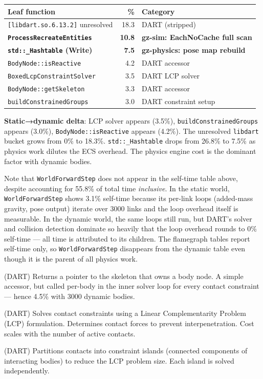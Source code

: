 \documentclass[11pt, a4paper]{article}
\begin{document}
\begin{longtable}[]{@{}lrl@{}}
\toprule\noalign{}
Leaf function & \% & Category \\
\midrule\noalign{}
\endhead
\bottomrule\noalign{}
\endlastfoot
\texttt{{[}libdart.so.6.13.2{]}} unresolved & 18.3 & DART (stripped) \\
\textbf{\texttt{ProcessRecreateEntities}} & \textbf{10.8} & \textbf{gz-sim: EachNoCache full scan} \\
\textbf{\texttt{std::\_Hashtable} (Write)} & \textbf{7.5} & \textbf{gz-physics: pose map rebuild} \\
\texttt{BodyNode::isReactive} & 4.2 & DART accessor \\
\texttt{BoxedLcpConstraintSolver} & 3.5 & DART LCP solver \\
\texttt{BodyNode::getSkeleton} & 3.3 & DART accessor \\
\texttt{buildConstrainedGroups} & 3.0 & DART constraint setup \\
\end{longtable}

\textbf{Static→dynamic delta}: LCP solver appears (3.5\%),
\texttt{buildConstrainedGroups} appears (3.0\%),
\texttt{BodyNode::isReactive} appears (4.2\%). The unresolved
\texttt{libdart} bucket grows from 0\% to 18.3\%. \texttt{std::\_Hashtable} drops from 26.8\% to 7.5\% as physics work dilutes the ECS overhead. The physics engine cost is the dominant factor with dynamic bodies.

Note that \texttt{WorldForwardStep} does not appear in the self-time table above, despite accounting for 55.8\% of total time \emph{inclusive}. In the static world, \texttt{WorldForwardStep} shows 3.1\% self-time because its per-link loops (added-mass gravity, pose output) iterate over 3000 links and the loop overhead itself is measurable. In the dynamic world, the same loops still run, but DART's solver and collision detection dominate so heavily that the loop overhead rounds to 0\% self-time --- all time is attributed to its children. The flamegraph tables report self-time only, so \texttt{WorldForwardStep} disappears from the dynamic table even though it is the parent of all physics work.

\begin{description}[style=nextline, leftmargin=1.5cm]
\item[\texttt{BodyNode::getSkeleton}] (DART) Returns a pointer to the skeleton that owns a body node. A simple accessor, but called per-body in the inner solver loop for every contact constraint --- hence 4.5\% with 3000 dynamic bodies.
\item[\texttt{BoxedLcpConstraintSolver}] (DART) Solves contact constraints using a Linear Complementarity Problem (LCP) formulation. Determines contact forces to prevent interpenetration. Cost scales with the number of active contacts.
\item[\texttt{buildConstrainedGroups}] (DART) Partitions contacts into constraint islands (connected components of interacting bodies) to reduce the LCP problem size. Each island is solved independently.
\end{description}
\end{document}
